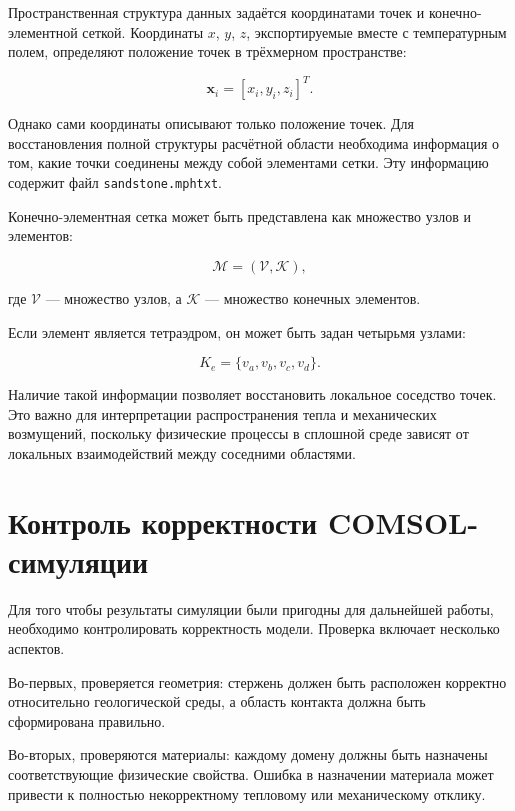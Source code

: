 Пространственная структура данных задаётся координатами точек и конечно-элементной сеткой. Координаты $x$, $y$, $z$, экспортируемые вместе с температурным полем, определяют положение точек в трёхмерном пространстве:

\begin{equation}
\mathbf{x}_i=[x_i,y_i,z_i]^T.
\end{equation}

Однако сами координаты описывают только положение точек. Для восстановления полной структуры расчётной области необходима информация о том, какие точки соединены между собой элементами сетки. Эту информацию содержит файл \texttt{sandstone.mphtxt}.

Конечно-элементная сетка может быть представлена как множество узлов и элементов:

\begin{equation}
\mathcal{M}=(\mathcal{V},\mathcal{K}),
\end{equation}

где $\mathcal{V}$ --- множество узлов, а $\mathcal{K}$ --- множество конечных элементов.

Если элемент является тетраэдром, он может быть задан четырьмя узлами:

\begin{equation}
K_e=\{v_a,v_b,v_c,v_d\}.
\end{equation}

Наличие такой информации позволяет восстановить локальное соседство точек. Это важно для интерпретации распространения тепла и механических возмущений, поскольку физические процессы в сплошной среде зависят от локальных взаимодействий между соседними областями.

\section{Контроль корректности COMSOL-симуляции}

Для того чтобы результаты симуляции были пригодны для дальнейшей работы, необходимо контролировать корректность модели. Проверка включает несколько аспектов.

Во-первых, проверяется геометрия: стержень должен быть расположен корректно относительно геологической среды, а область контакта должна быть сформирована правильно.

Во-вторых, проверяются материалы: каждому домену должны быть назначены соответствующие физические свойства. Ошибка в назначении материала может привести к полностью некорректному тепловому или механическому отклику.

